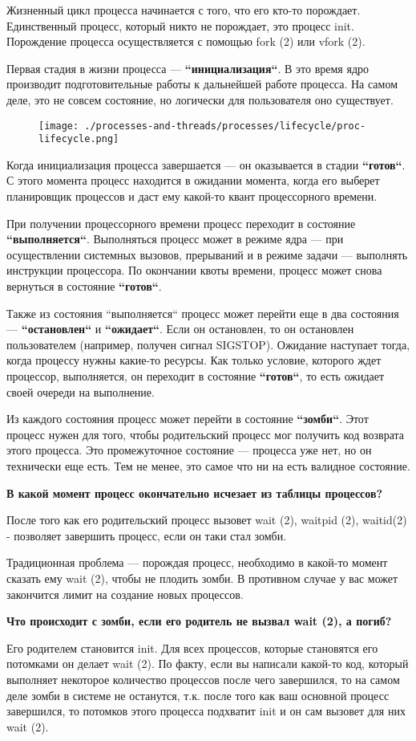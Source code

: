Жизненный цикл процесса начинается с того, что его кто-то порождает. Единственный процесс, который никто не порождает, это процесс init. Порождение процесса осуществляется с помощью fork (2) или vfork (2). 

Первая стадия в жизни процесса --- \textbf{“инициализация“}. В это время ядро производит подготовительные работы к дальнейшей работе процесса. На самом деле, это не совсем состояние, но логически для пользователя оно существует.

\begin{figure}[htbp]
  \centering
  \texttt{[image: ./processes-and-threads/processes/lifecycle/proc-lifecycle.png]}
\end{figure}

Когда инициализация процесса завершается --- он оказывается в стадии \textbf{“готов“}. С этого момента процесс находится в ожидании момента, когда его выберет планировщик процессов и даст ему какой-то квант процессорного времени.

При получении процессорного времени процесс переходит в состояние \textbf{“выполняется“}. Выполняться процесс может в режиме ядра --- при осуществлении системных вызовов, прерываний и в режиме задачи --- выполнять инструкции процессора. По окончании квоты времени, процесс может снова вернуться в состояние \textbf{“готов“}.

Также из состояния “выполняется“ процесс может перейти еще в два состояния --- \textbf{“остановлен“} и \textbf{“ожидает“}. Если он остановлен, то он остановлен пользователем (например, получен сигнал SIGSTOP). Ожидание наступает тогда, когда процессу нужны какие-то ресурсы. Как только условие, которого ждет процессор, выполняется, он переходит в состояние \textbf{“готов“}, то есть ожидает своей очереди на выполнение. 

Из каждого состояния процесс может перейти в состояние \textbf{“зомби“}. Этот процесс нужен для того, чтобы родительский процесс мог получить код возврата этого процесса. Это промежуточное состояние --- процесса уже нет, но он технически еще есть. Тем не менее, это самое что ни на есть валидное состояние. 

\textbf{В какой момент процесс окончательно исчезает из таблицы процессов?}

После того как его родительский процесс вызовет wait (2), waitpid (2), waitid(2) - позволяет завершить процесс, если он таки стал зомби. 

Традиционная проблема --- порождая процесс, необходимо в какой-то момент сказать ему wait (2), чтобы не плодить зомби. В противном случае у вас может закончится лимит на создание новых процессов. 

\textbf{Что происходит с зомби, если его родитель не вызвал wait (2), а погиб?}

Его родителем становится init. Для всех процессов, которые становятся его потомками он делает wait (2). По факту, если вы написали какой-то код, который выполняет некоторое количество процессов после чего завершился, то на самом деле зомби в системе не останутся, т.к. после того как ваш основной процесс завершился, то потомков этого процесса подхватит init и он сам вызовет для них wait (2).
